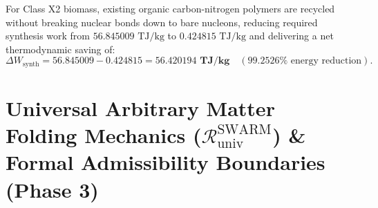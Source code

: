 \documentclass[11pt,onecolumn]{article}
\begin{document}
\FloatBarrier
\begin{table}[!htbp]
\centering\small
\caption{Xenobiological Triage Classification, Complexity Thresholds, and Hardware Responses.}
\label{tab:xeno_triage_matrix}
\end{table}
\FloatBarrier

For Class X2 biomass, existing organic carbon-nitrogen polymers are recycled without breaking nuclear bonds down to bare nucleons, reducing required synthesis work from $56.845009\text{ TJ/kg}$ to $0.424815\text{ TJ/kg}$ and delivering a net thermodynamic saving of:
\begin{equation}
\Delta W_{\text{synth}} = 56.845009 - 0.424815 = \mathbf{56.420194\text{ TJ/kg}} \quad (\mathbf{99.2526\%}\text{ energy reduction}).
\label{eq:class_x2_savings}
\end{equation}



\FloatBarrier
\section{\texorpdfstring{Universal Arbitrary Matter Folding Mechanics ($\mathcal{R}_{\text{univ}}^{\text{SWARM}}$) \& Formal Admissibility Boundaries (Phase 3)}{Universal Arbitrary Matter Folding Mechanics (R\_univ\textasciicircum SWARM) \& Formal Admissibility Boundaries (Phase 3)}}
\end{document}
